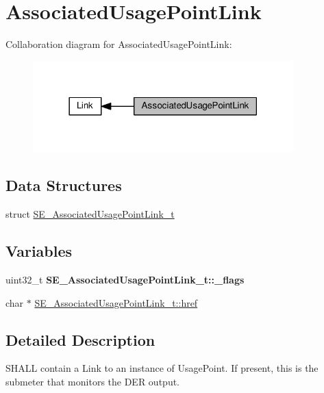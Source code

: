 \hypertarget{group__AssociatedUsagePointLink}{}\section{Associated\+Usage\+Point\+Link}
\label{group__AssociatedUsagePointLink}
Collaboration diagram for Associated\+Usage\+Point\+Link\+:\nopagebreak
\begin{figure}[H]
\begin{center}
\leavevmode
\includegraphics[width=285pt]{group__AssociatedUsagePointLink}
\end{center}
\end{figure}
\subsection*{Data Structures}
\begin{DoxyCompactItemize}
\item 
struct \hyperlink{structSE__AssociatedUsagePointLink__t}{S\+E\+\_\+\+Associated\+Usage\+Point\+Link\+\_\+t}
\end{DoxyCompactItemize}
\subsection*{Variables}
\begin{DoxyCompactItemize}
\item 
\mbox{\label{group__AssociatedUsagePointLink_gac62039da9b5558a1bd9e5c5da74a9404}} 
uint32\+\_\+t {\bfseries S\+E\+\_\+\+Associated\+Usage\+Point\+Link\+\_\+t\+::\+\_\+flags}
\item 
char $\ast$ \hyperlink{group__AssociatedUsagePointLink_gafee3c39a277193f4fbf70e6c77414389}{S\+E\+\_\+\+Associated\+Usage\+Point\+Link\+\_\+t\+::href}
\end{DoxyCompactItemize}


\subsection{Detailed Description}
S\+H\+A\+LL contain a Link to an instance of Usage\+Point. If present, this is the submeter that monitors the D\+ER output. 

